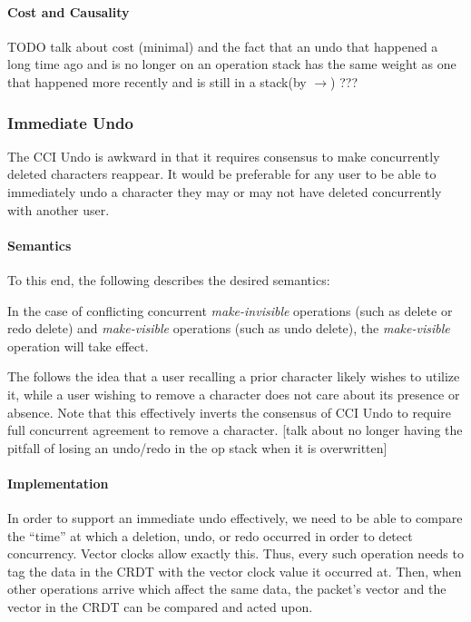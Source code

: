 \documentclass[12pt,a4paper,twoside,openright]{report}
\begin{document}
			\paragraph{Cost and Causality}
			TODO
			talk about cost (minimal) and the fact that an undo that happened a long time ago and is no longer on an operation stack has the same weight as one that happened more recently and is still in a stack(by $\rightarrow$) ??? 
			
		\subsubsection{Immediate Undo}
		The CCI Undo is awkward in that it requires consensus to make concurrently deleted characters reappear. It would be preferable for any user to be able to immediately undo a character they may or may not have deleted concurrently with another user.
		
			\paragraph{Semantics}
			To this end, the following describes the desired semantics:
			
			In the case of conflicting concurrent \textit{make-invisible} operations (such as delete or redo delete) and \textit{make-visible} operations (such as undo delete), the \textit{make-visible} operation will take effect.
			
			The follows the idea that a user recalling a prior character likely wishes to utilize it, while a user wishing to remove a character does not care about its presence or absence. Note that this effectively inverts the consensus of CCI Undo to require full concurrent agreement to remove a character.  [talk about no longer having the pitfall of losing an undo/redo in the op stack when it is overwritten]
			
			\paragraph{Implementation}
			In order to support an immediate undo effectively, we need to be able to compare the ``time'' at which a deletion, undo, or redo occurred in order to detect concurrency. Vector clocks allow exactly this. Thus, every such operation needs to tag the data in the CRDT with the vector clock value it occurred at. Then, when other operations arrive which affect the same data, the packet's vector and the vector in the CRDT can be compared and acted upon.
			
\end{document}
